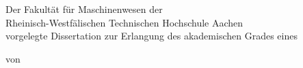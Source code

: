 
\pagestyle{empty}

\begin{center}
	
	
	\vspace{3cm}
	
	\LARGE \titel
	
	\vspace{2cm}
	
	\LARGE \titeleng
	
	\large
	
	\vspace{4cm}
	
	Der Fakultät für Maschinenwesen der \\
	Rheinisch-Westfälischen Technischen Hochschule Aachen \\
    vorgelegte Dissertation zur Erlangung des akademischen Grades eines \\
	
	\vspace{1cm}
	
	von
	
	\vspace{1cm}
	
	\autor \\
	
	
	
\end{center}

\cleardoublepage

\pagestyle{scrheadings}
